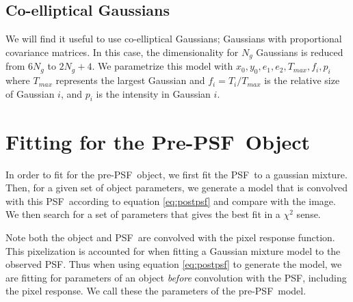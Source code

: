 \documentclass[12pt,preprint]{aastex}
\newcommand{\psf}{PSF}
\begin{document}
\subsection{Co-elliptical Gaussians}

We will find it useful to use co-elliptical Gaussians; Gaussians with
proportional covariance matrices.  In this case, the dimensionality for $N_g$
Gaussians is reduced from $6 N_g$ to $2 N_g + 4$.  We parametrize this model
with $x_0, y_0, e_1, e_2, T_{max}, f_{i}, p_{i}$ where $T_{max}$ represents
the largest Gaussian and $f_{i} = T_{i}/T_{max}$ is the relative size of
Gaussian $i$, and $p_i$ is the intensity in Gaussian $i$.











\section{Fitting for the Pre-\psf\ Object}

In order to fit for the pre-\psf\ object, we first fit the \psf\ to a gaussian
mixture.  Then, for a given set of object parameters, we generate a model that
is convolved with this \psf\ according to equation \ref{eq:postpsf} and compare
with the image.  We then search for a set of parameters that gives the best fit
in a $\chi^2$ sense.  

Note both the object and \psf\ are convolved with the pixel response function.
This pixelization is accounted for when fitting a Gaussian mixture model to the
observed \psf.  Thus when using equation \ref{eq:postpsf} to generate the
model, we are fitting for parameters of an object {\it before} convolution with
the \psf, including the pixel response.  We call these the parameters of the
pre-\psf\ model.
\end{document}
